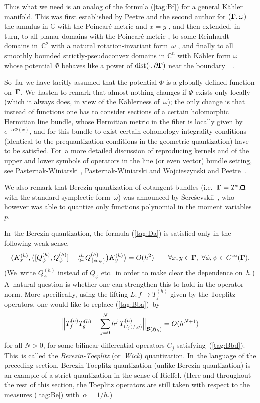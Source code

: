 \documentclass[12pt]{amsart}
\numberwithin{equation}{section}
\theoremstyle{remark}
\newcommand\h{^{(h)}}
\newcommand\Omg{{\bigam}}   %
\newcommand\HH{\mathfrak H}
\newcommand{\CC}{\C}
\newcommand{\bigam}{\mbox{\boldmath $\Gamma$}}
\newcommand{\bfrakQ}{\mbox{\boldmath $\mathfrak Q$}}
\newcommand{\C}{\mathbb C}
\begin{document}
Thus what we need is an analog of the formula (\ref{tag:Bf}) for a general
K\"ahler manifold. This was first established by Peetre and the second author
for $(\Omg,\omega)$ the annulus in $\CC$ with the Poincar\'e metric and $x=y$
\cite{bib:EP}, and then extended, in turn, to all planar domains with the
Poincar\'e metric \cite{bib:Duke}, to some Reinhardt domains in~$\CC^2$ with a
natural rotation-invariant form~$\omega$ \cite{bib:ET}, and finally to all
smoothly bounded strictly-pseudoconvex domains in $\CC^n$ with K\"ahler form
$\omega$ whose potential $\Phi$ behaves like a power of $\operatorname{dist}
(\cdot,\partial\Omg)$ near the boundary~\cite{bib:FR}~\cite{bib:ESI}.

So~far we have tacitly assumed that the potential $\Phi$ is a globally defined
function on~$\Omg$. We~hasten to remark that almost nothing changes if $\Phi$
exists only locally (which it always does, in view of the K\"ahlerness
of~$\omega$); the only change is that instead of functions one has to consider
sections of a certain holomorphic Hermitian line bundle, whose Hermitian
metric in the fiber is locally given by $e^{-\alpha\Phi(x)}$, and for this
bundle to exist certain cohomology integrality conditions (identical to the
prequantization conditions in the geometric quantization) have to be satisfied.
For~a more detailed discussion of reproducing kernels and of the upper and
lower symbols of operators in the line (or even vector) bundle setting, see
Pasternak-Winiarski \cite{bib:PWin}, Pasternak-Winiarski and Wojcieszynski
\cite{bib:PWinW} and Peetre~\cite{bib:Pee}.

We also remark that Berezin quantization of cotangent bundles (i.e.~$\Omg=T^*
\bfrakQ$ with the standard symplectic form~$\omega$) was announced by
\v{S}ere\v sevskii~\cite{bib:Sher}, who however was able to quantize only
functions polynomial in the moment variables~$p$.

In~the Berezin quantization, the formula (\ref{tag:Da}) is satisfied only in
the following weak sense,
$$ \big\langle K\h_x, \big( [Q\h_\phi,Q\h_\psi] + \tfrac{ih}{2\pi}
Q\h_{\{\phi,\psi\}} \big) K\h_y \big\rangle = O(h^2) \qquad
\forall x,y\in\Omg, \ \forall \phi,\psi\in C^\infty(\Omg).  $$
(We~write $Q\h_\phi$ instead of $Q_\phi$ etc.~in order to make clear the
dependence on~$h$.) A~natural question is whether one can strengthen this to
hold in the operator norm. More specifically, using the lifting $L:f\mapsto T\h
_f$ given by the Toeplitz operators, one would like to replace
(\ref{tag:Bba})~by
\begin{equation}  \Big\| T\h_f T\h_g - \sum_{j=0}^N h^j \,
T\h_{C_j(f,g)} \Big\|  _{\Cal B(\HH_h)} = O(h^{N+1})   \label{tag:Bg}
\end{equation}
for all $N>0$, for some bilinear differential operators $C_j$
satisfying~(\ref{tag:Bbd}). This~is called the {\it Berezin-Toeplitz\/}
(or~{\it Wick\/}) quantization. In~the language of the preceding section,
Berezin-Toeplitz quantization (unlike Berezin quantization) is an example of
a strict quantization in the sense of Rieffel. (Here and throughout the rest
of this section, the Toeplitz operators are still taken with respect to the
measures (\ref{tag:Be}) with~$\alpha=1/h$.)
\end{document}
